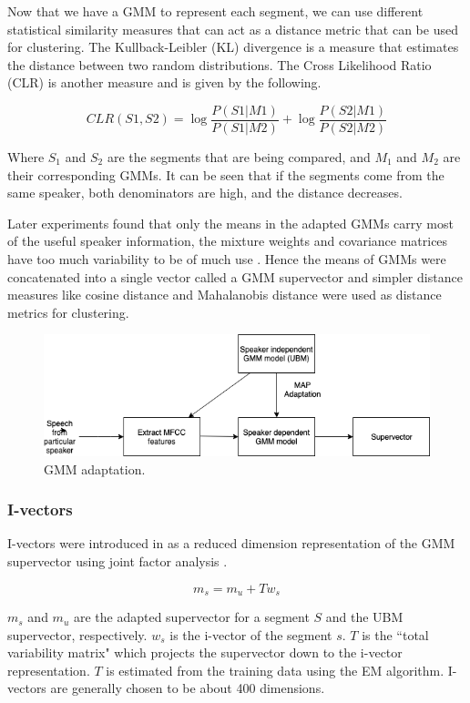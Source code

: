 		Now that we have a GMM to represent each segment, we can use different statistical similarity measures that can act as a distance metric that can be used for clustering. The Kullback-Leibler (KL) divergence \cite{kullback1997information} is a measure that estimates the distance between two random distributions. The Cross Likelihood Ratio (CLR) \cite{barras2004improving} is another measure and is given by the following.
		
		$$ CLR(S1, S2) = \log\frac{P(S1|M1)}{P(S1|M2)} + \log\frac{P(S2|M1)}{P(S2|M2)} $$
		
		Where $S_1$ and $S_2$ are the segments that are being compared, and $M_1$ and $M_2$ are their corresponding GMMs. It can be seen that if the segments come from the same speaker, both denominators are high, and the distance decreases.
		
		Later experiments found that only the means in the adapted GMMs carry most of the useful speaker information, the mixture weights and covariance matrices have too much variability to be of much use \cite{kinnunen2010overview}. Hence the means of GMMs were concatenated into a single vector called a GMM supervector and simpler distance measures like cosine distance and Mahalanobis distance \cite{de2000mahalanobis} were used as distance metrics for clustering.
		
		\begin{figure}[h]
			\includegraphics[width=15cm]{figures/supervector.png}
			\centering
			\caption{GMM adaptation.}
			\label{fig:fig-supervector}
		\end{figure}

		\subsubsection{I-vectors}
		I-vectors were introduced in \cite{5545402} as a reduced dimension representation of the GMM supervector using joint factor analysis \cite{kenny2005joint}.
		
		$$ m_s = m_u + Tw_s $$
		
		$m_s$ and $m_u$ are the adapted supervector for a segment $S$ and the UBM supervector, respectively. $w_s$ is the i-vector of the segment $s$. $T$ is the ``total variability matrix" which projects the supervector down to the i-vector representation. $T$ is estimated from the training data using the EM algorithm. I-vectors are generally chosen to be about 400 dimensions.
		
